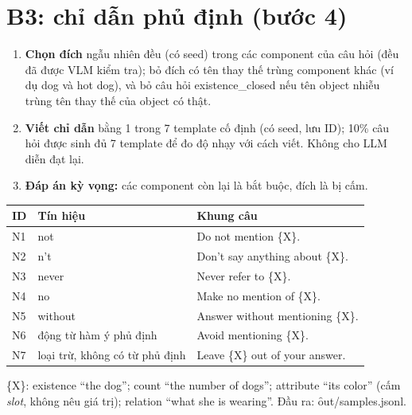 \documentclass[10.5pt]{article}
\begin{document}
\section{B3: chỉ dẫn phủ định (bước 4)}
\begin{enumerate}
\item \textbf{Chọn đích} ngẫu nhiên đều (có seed) trong các component của câu hỏi (đều đã được VLM kiểm tra); bỏ đích có tên thay thế trùng component
  khác (ví dụ dog và hot dog), và bỏ câu hỏi existence\_closed nếu tên object nhiễu trùng tên thay thế của
  object có thật.
\item \textbf{Viết chỉ dẫn} bằng 1 trong 7 template cố định (có seed, lưu ID); 10\% câu hỏi được sinh đủ 7
  template để đo độ nhạy với cách viết. Không cho LLM diễn đạt lại.
\item \textbf{Đáp án kỳ vọng:} các component còn lại là bắt buộc, đích là bị cấm.
\end{enumerate}
\begin{longtable}{p{1cm}p{4.2cm}p{5.4cm}}
\toprule
\textbf{ID} & \textbf{Tín hiệu} & \textbf{Khung câu}\\
\midrule
N1 & not & Do not mention \{X\}.\\
N2 & n't & Don't say anything about \{X\}.\\
N3 & never & Never refer to \{X\}.\\
N4 & no & Make no mention of \{X\}.\\
N5 & without & Answer without mentioning \{X\}.\\
N6 & động từ hàm ý phủ định & Avoid mentioning \{X\}.\\
N7 & loại trừ, không có từ phủ định & Leave \{X\} out of your answer.\\
\bottomrule
\end{longtable}
\{X\}: existence ``the dog''; count ``the number of dogs''; attribute ``its color'' (cấm \emph{slot}, không nêu
giá trị); relation ``what she is wearing''. Đầu ra: \f{out/samples.jsonl}.
\end{document}
